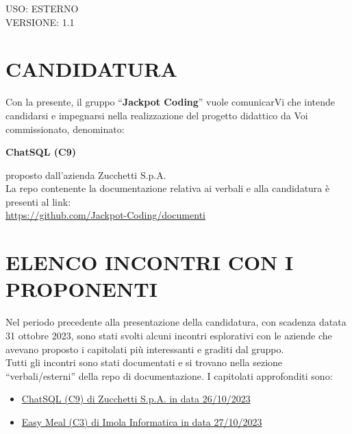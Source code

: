 \documentclass[5pt]{article}
\begin{document}
\begin{flushright}
    \begin{spacing}{1}
        USO: ESTERNO\\
        VERSIONE: 1.1\\
    \end{spacing}
\end{flushright}


\restoregeometry

\pagebreak






\section{\Large CANDIDATURA}
Con la presente, il gruppo “\textbf{Jackpot Coding}” vuole comunicarVi che intende candidarsi e impegnarsi nella realizzazione del progetto didattico da Voi commissionato, denominato:

\begin{center}
    \textbf{ChatSQL (C9)}
\end{center}

\noindent proposto dall’azienda Zucchetti S.p.A. \\
La repo contenente la documentazione relativa ai verbali e alla candidatura è presenti al link: \\ \href{https://github.com/Jackpot-Coding/documenti}{https://github.com/Jackpot-Coding/documenti}

\vspace{20pt}
\section{\Large ELENCO INCONTRI CON I PROPONENTI}
Nel periodo precedente alla presentazione della candidatura, con scadenza datata 31 ottobre 2023, sono stati svolti alcuni incontri esplorativi con le aziende che avevano proposto i capitolati più interessanti e graditi dal gruppo.\\

\medskip
\noindent Tutti gli incontri sono stati documentati e si trovano nella sezione “verbali/esterni” della repo di documentazione. I capitolati approfonditi sono:\\
\begin{itemize}
    \item \href{https://github.com/Jackpot-Coding/documenti/blob/6c8377d2d8a50156a56929086edf8c3d3dc32f94/verbali/esterni/26-10-2023%20Zucchetti.pdf}{ChatSQL (C9) di Zucchetti S.p.A. in data 26/10/2023}
    \item \href{https://github.com/Jackpot-Coding/documenti/blob/6c8377d2d8a50156a56929086edf8c3d3dc32f94/verbali/esterni/27-10-2023%20Imola%20Informatica.pdf}{Easy Meal (C3) di Imola Informatica in data 27/10/2023}
\end{itemize}
\end{document}
